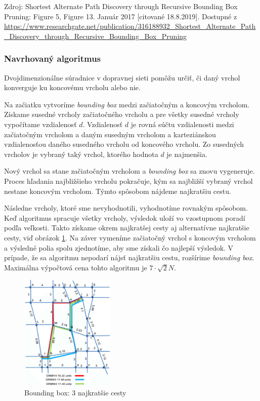\begin{footnotesize}
Zdroj: Shortest Alternate Path Discovery through Recursive Bounding Box Pruning: Figure 5, Figure 13. Január 2017 [citované 18.8.2019]. Dostupné z \url{https://www.researchgate.net/publication/316188932_Shortest_Alternate_Path_Discovery_through_Recursive_Bounding_Box_Pruning}
\end{footnotesize}

\subsubsection{Navrhovaný algoritmus}
Dvojdimenzionálne súradnice v dopravnej sieti pomôžu určiť, či daný vrchol konverguje ku koncovému vrcholu alebo nie. 

Na začiatku vytvoríme \textit{bounding box} medzi začiatočným a koncovým vrcholom. Získame susedné vrcholy začiatočného vrcholu a pre všetky susedné vrcholy vypočítame vzdialenosť $d$. Vzdialenosť $d$ je rovná súčtu vzdialenosti medzi začiatočným vrcholom a daným susedným vrcholom a karteziánskou vzdialenosťou daného susedného vrcholu od koncového vrcholu. Zo susedných vrcholov je vybraný taký vrchol, ktorého hodnota $d$ je najmenšia. 

Nový vrchol sa stane začiatočným vrcholom a \textit{bounding box} sa znovu vygeneruje. Proces hľadania najbližšieho vrcholu pokračuje, kým sa najbližší vybraný vrchol nestane koncovým vrcholom. Týmto spôsobom nájdeme najkratšiu cestu. 

Následne vrcholy, ktoré sme nevyhodnotili, vyhodnotíme rovnakým spôsobom. Keď algoritmus spracuje všetky vrcholy, výsledok uloží vo vzostupnom poradí podľa veľkosti. Takto získame okrem najkratšej cesty aj alternatívne najkratšie cesty, viď obrázok \ref{fig:boundingBoxResult}. Na záver vymeníme začiatočný vrchol s koncovým vrcholom a výsledné polia spolu zjednotíme, aby sme získali čo najlepší výsledok. V prípade, že sa algoritmu nepodarí nájsť najkratšiu cestu, rozšírime \textit{bounding box}. Maximálna výpočtová cena tohto algoritmu je $7 \cdot \sqrt{2}N$.

\begin{figure}[H]
\centerline{\includegraphics[width=0.4\textwidth]{images/bounding-box-result}}
\caption[Bounding box: 3 najkratšie cesty]{Bounding box: 3 najkratšie cesty}
\label{fig:boundingBoxResult}
\end{figure}

